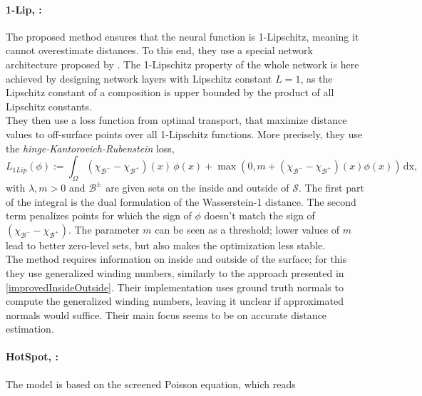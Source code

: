 \documentclass[12pt,openany]{book}
\def\S{\mathcal{S}}
\theoremstyle{plainnormal}
\theoremstyle{remark}
\begin{document}
\paragraph{1-Lip, \cite{1lip}:} The proposed method ensures that the neural function is 1-Lipschitz, meaning it cannot overestimate distances. To this end, they use a special network architecture proposed by \cite{araujo2023unifiedalgebraicperspectivelipschitz}. The 1-Lipschitz property of the whole network is here achieved by designing network layers with Lipschitz constant $L=1$, as the Lipschitz constant of a composition is upper bounded by the product of all Lipschitz constants.\\
They then use a loss function from optimal transport, that maximize distance values to off-surface points over all 1-Lipschitz functions. More precisely, they use the \emph{hinge-Kantorovich-Rubenstein} loss, 
$$
L_{1Lip}(\phi) := \int_\Omega (\chi_{\mathcal B^-}-\chi_{\mathcal B^+})(x)\,\phi(x)  + \max(0,m+ (\chi_{\mathcal B^-}-\chi_{\mathcal B^+})(x)\phi(x))\,\mathrm{dx},
$$
with $\lambda,m >0$ and $\mathcal{B}^\pm$ are given sets on the inside and outside of $\S$. The first part of the integral is the dual formulation of the Wasserstein-1 distance. The second term  penalizes points for which the sign of $\phi$ doesn't match the sign of $ (\chi_{\mathcal B^-}-\chi_{\mathcal B^+})$. The parameter $m$ can be seen as a threshold; lower values of $m$ lead to better zero-level sets, but also makes the optimization less stable.\\
The method requires information on inside and outside of the surface; for this they use generalized winding numbers, similarly to the approach presented in \cref{improvedInsideOutside}. Their implementation uses ground truth normals to compute the generalized winding numbers, leaving it unclear if approximated normals would suffice. Their main focus seems to be on accurate distance estimation.
\paragraph{HotSpot, \cite{hotspot}:} The model is based on the screened Poisson equation, which reads
\end{document}
